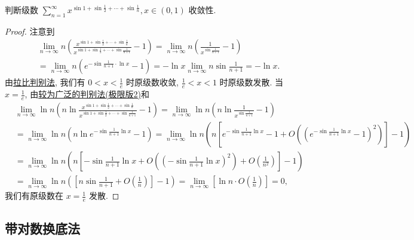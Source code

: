 \documentclass[../../main.tex]{subfiles}%
\begin{document}
\begin{example}
判断级数 $\sum_{n=1}^{\infty} x^{\sin 1 + \sin \frac{1}{2} + \cdots + \sin \frac{1}{n}}, x \in (0,1)$ 收敛性.
\end{example}
\begin{proof}

注意到
\begin{align*}
&\lim_{n \to \infty} n \left( \frac{x^{\sin 1 + \sin \frac{1}{2} + \cdots + \sin \frac{1}{n}}}{x^{\sin 1 + \sin \frac{1}{2} + \cdots + \sin \frac{1}{n+1}}} - 1 \right) = \lim_{n \to \infty} n \left( \frac{1}{x^{\sin \frac{1}{n+1}}} - 1 \right) \\
&= \lim_{n \to \infty} n \left( e^{-\sin \frac{1}{n+1} \cdot \ln x} - 1 \right) = -\ln x \lim_{n \to \infty} n \sin \frac{1}{n+1} = -\ln x.
\end{align*}
由\hyperref[theorem:拉比判别法]{拉比判别法}, 我们有 $0 < x < \frac{1}{e}$ 时原级数收敛, $\frac{1}{e} < x < 1$ 时原级数发散. 当 $x = \frac{1}{e}$, 由\hyperref[theorem:较为广泛的判别法]{较为广泛的判别法(极限版2)}和
\begin{align*}
&\lim_{n \to \infty} \ln n \left( n \ln \frac{x^{\sin 1 + \sin \frac{1}{2} + \cdots + \sin \frac{1}{n}}}{x^{\sin 1 + \sin \frac{1}{2} + \cdots + \sin \frac{1}{n+1}}} - 1 \right) = \lim_{n \to \infty} \ln n \left( n \ln \frac{1}{x^{\sin \frac{1}{n+1}}} - 1 \right) \\
&= \lim_{n \to \infty} \ln n \left( n \ln e^{-\sin \frac{1}{n+1} \ln x} - 1 \right) = \lim_{n \to \infty} \ln n \left( n \left[ e^{-\sin \frac{1}{n+1} \ln x} - 1 + O \left( \left( e^{-\sin \frac{1}{n+1} \ln x} - 1 \right)^2 \right) \right] - 1 \right) \\
&= \lim_{n \to \infty} \ln n \left( n \left[ -\sin \frac{1}{n+1} \ln x + O \left( \left( -\sin \frac{1}{n+1} \ln x \right)^2 \right) + O \left( \frac{1}{n^2} \right) \right] - 1 \right) \\
&= \lim_{n \to \infty} \ln n \left( \left[ n \sin \frac{1}{n+1} + O \left( \frac{1}{n} \right) \right] - 1 \right) = \lim_{n \to \infty} \left[ \ln n \cdot O \left( \frac{1}{n} \right) \right] = 0,
\end{align*}
我们有原级数在 $x = \frac{1}{e}$ 发散.

\end{proof}



\subsection{带对数换底法}
\end{document}

